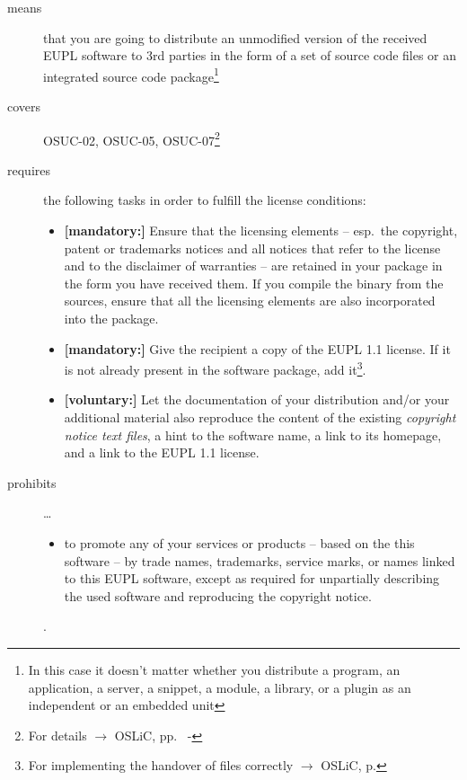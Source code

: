 \begin{description}

\item[means] that you are going to distribute an unmodified version of the
received EUPL software to 3rd parties in the form of a set of source code files or
an integrated source code package\footnote{In this case it doesn't matter
whether you  distribute a program, an application, a server, a snippet, a
module, a library, or a plugin as an independent or an embedded unit}

\item[covers] OSUC-02, OSUC-05, OSUC-07\footnote{For details $\rightarrow$ OSLiC, pp.\ 
\pageref{OSUC-02-DEF} - \pageref{OSUC-07-DEF}}

\item[requires] the following tasks in order to fulfill the license conditions:
\begin{itemize}
  
  \item \textbf{[mandatory:]} Ensure that the licensing elements -- esp.\ the
  copyright, patent or trademarks notices and all notices that refer to the
  license and to the disclaimer of warranties -- are retained in your package in
  the form you have received them. If you compile the binary from the sources,
  ensure that all the licensing elements are also incorporated into the package.
  
  \item \textbf{[mandatory:]} Give the recipient a copy of the EUPL 1.1
  license. If it is not already present in the software package, add
  it\footnote{For implementing the handover of files correctly $\rightarrow$
  OSLiC, p. \pageref{DistributingFilesHint}}.
  
  \item \textbf{[voluntary:]} Let the documentation of your distribution and/or
  your additional material also reproduce the content of the existing
  \emph{copyright notice text files}, a hint to the software name, a link to its
  homepage, and a link to the EUPL 1.1 license.
\end{itemize}

\item[prohibits] \ldots
\begin{itemize}
  \item to promote any of your services or products – based on the this software
  – by trade names, trademarks, service marks, or names linked to this EUPL
  software, except as required for unpartially describing the used software and
  reproducing the copyright notice.
\end{itemize}.

\end{description}


